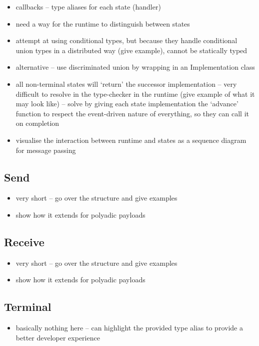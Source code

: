 \begin{itemize}
\item callbacks -- type aliases for each state (handler)
\item need a way for the runtime to distinguish between states
\item attempt at using conditional types, but because they handle conditional union types in a distributed way (give example), cannot be statically typed
\item alternative -- use discriminated union by wrapping in an Implementation class
\item all non-terminal states will `return' the successor implementation -- very difficult to resolve in the type-checker in the runtime (give example of what it may look like) -- solve by giving each state implementation the `advance' function to respect the event-driven nature of everything, so they can call it on completion
\item visualise the interaction between runtime and states as a sequence diagram for message passing
\end{itemize}

\subsection{Send}
\begin{itemize}
\item very short -- go over the structure and give examples
\item show how it extends for polyadic payloads
\end{itemize}

\subsection{Receive}
\begin{itemize}
\item very short -- go over the structure and give examples
\item show how it extends for polyadic payloads
\end{itemize}

\subsection{Terminal}
\begin{itemize}
\item basically nothing here -- can highlight the provided type alias to provide a better developer experience
\end{itemize}

